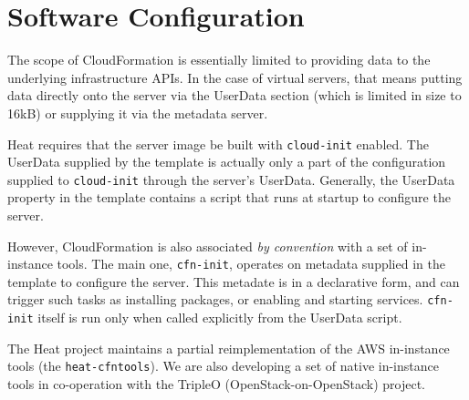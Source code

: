 \section{Software Configuration}

The scope of CloudFormation is essentially limited to providing data to the underlying infrastructure APIs. In the case of virtual servers, that means putting data directly onto the server via the UserData section (which is limited in size to 16kB) or supplying it via the metadata server.

Heat requires that the server image be built with \texttt{cloud-init} enabled. The UserData supplied by the template is actually only a part of the configuration supplied to \texttt{cloud-init} through the server's UserData. Generally, the UserData property in the template contains a script that runs at startup to configure the server.

However, CloudFormation is also associated \emph{by convention} with a set of in-instance tools. The main one, \texttt{cfn-init}, operates on metadata supplied in the template to configure the server. This metadate is in a declarative form, and can trigger such tasks as installing packages, or enabling and starting services. \texttt{cfn-init} itself is run only when called explicitly from the UserData script.

The Heat project maintains a partial reimplementation of the AWS in-instance tools (the \texttt{heat-cfntools}). We are also developing a set of native in-instance tools in co-operation with the TripleO (OpenStack-on-OpenStack) project.
